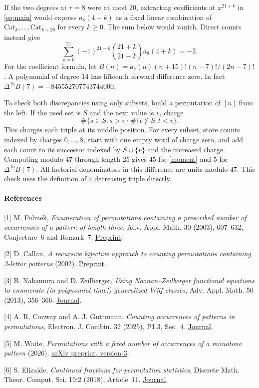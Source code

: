 \documentclass[11pt,letterpaper]{article}
\newcommand{\Cat}{\mathrm{Cat}}
\begin{document}
If the two degrees at $r=8$ were at most 20, extracting coefficients at $x^{21+k}$ in \eqref{eq:main} would express $a_8(4+k)$ as a fixed linear combination of $\Cat_{k},\ldots,\Cat_{k+20}$ for every $k\ge0$. The sum below would vanish. Direct counts instead give
\begin{equation}
 \sum_{k=0}^{21}(-1)^{21-k}\binom{21+k}{21-k}a_8(4+k)=-2. \label{moment}
\end{equation}
For the coefficient formula, let $B(n)=a_7(n)(n+15)!(n-7)!/(2n-7)!$. A polynomial of degree 14 has fifteenth forward difference zero. In fact $\Delta^{15}B(7)=-845552707743744000$.

To check both discrepancies using only subsets, build a permutation of $[n]$ from the left. If the used set is $S$ and the next value is $v$, charge
\[
 \#\{s\in S:s>v\}\ \#\{t\notin S:t<v\}.
\]
This charges each triple at its middle position. For every subset, store counts indexed by charges $0,\ldots,8$, start with one empty word of charge zero, and add each count to its successor indexed by $S\cup\{v\}$ and the increased charge. Computing modulo 47 through length 25 gives $45$ for \eqref{moment} and $5$ for $\Delta^{15}B(7)$. All factorial denominators in this difference are units modulo 47. This check uses the definition of a decreasing triple directly.

\paragraph{References}
[1] M. Fulmek, \emph{Enumeration of permutations containing a prescribed number of occurrences of a pattern of length three}, Adv. Appl. Math. 30 (2003), 607--632, Conjecture~6 and Remark~7. \href{https://arxiv.org/pdf/math/0112092}{Preprint}.

[2] D. Callan, \emph{A recursive bijective approach to counting permutations containing 3-letter patterns} (2002). \href{https://arxiv.org/abs/math/0211380}{Preprint}.

[3] B. Nakamura and D. Zeilberger, \emph{Using Noonan--Zeilberger functional equations to enumerate (in polynomial time!) generalized Wilf classes}, Adv. Appl. Math. 50 (2013), 356--366. \href{https://doi.org/10.1016/j.aam.2012.10.003}{Journal}.

[4] A. R. Conway and A. J. Guttmann, \emph{Counting occurrences of patterns in permutations}, Electron. J. Combin. 32 (2025), P1.3, Sec.~4. \href{https://doi.org/10.37236/12963}{Journal}.

[5] M. Waite, \emph{Permutations with a fixed number of occurrences of a monotone pattern} (2026). \href{https://arxiv.org/pdf/2506.05712v3}{arXiv preprint, version 3}.

[6] S. Elizalde, \emph{Continued fractions for permutation statistics}, Discrete Math. Theor. Comput. Sci. 19:2 (2018), Article~11. \href{https://dmtcs.episciences.org/articles/4602}{Journal}.
\end{document}
